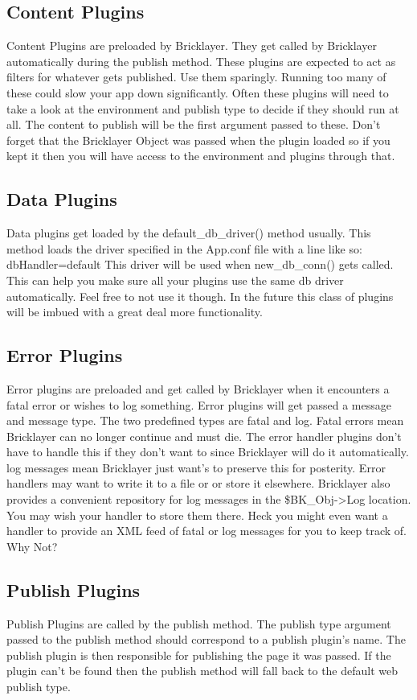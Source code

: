 \subsection{Content Plugins}
Content Plugins are preloaded by Bricklayer. They get called by Bricklayer automatically during the publish method. These plugins are expected to act as filters for whatever gets published. Use them sparingly. Running too many of these could slow your app down significantly. Often these plugins will need to take a look at the environment and publish type to decide if they should run at all. The content to publish will be the first argument passed to these. Don't forget that the Bricklayer Object was passed when the plugin loaded so if you kept it then you will have access to the environment and plugins through that.
\subsection{Data Plugins}
Data plugins get loaded by the default\_db\_driver() method usually. This method loads the driver specified in the App.conf file with a line like so: dbHandler=default This driver will be used when new\_db\_conn() gets called. This can help you make sure all your plugins use the same db driver automatically. Feel free to not use it though. In the future this class of plugins will be imbued with a great deal more functionality.
\subsection{Error Plugins}
Error plugins are preloaded and get called by Bricklayer when it encounters a fatal error or wishes to log something. Error plugins will get passed a message and message type. The two predefined types are fatal and log. Fatal errors mean Bricklayer can no longer continue and must die. The error handler plugins don't have to handle this if they don't want to since Bricklayer will do it automatically. log messages mean Bricklayer just want's to preserve this for posterity. Error handlers may want to write it to a file or or store it elsewhere. Bricklayer also provides a convenient repository for log messages in the \$BK\_Obj->{Log} location. You may wish your handler to store them there. Heck you might even want a handler to provide an XML feed of fatal or log messages for you to keep track of. Why Not?
\subsection{Publish Plugins}
Publish Plugins are called by the publish method. The publish type argument passed to the publish method should correspond to a publish plugin's name. The publish plugin is then responsible for publishing the page it was passed. If the plugin can't be found then the publish method will fall back to the default web publish type.